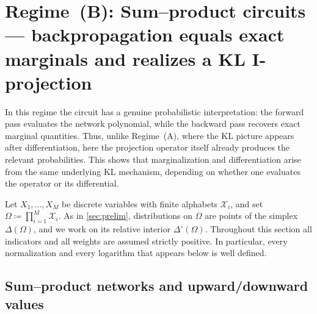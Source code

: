 \documentclass[12pt]{article}
\newcommand{\1}{\mathbb{1}}
\newcommand{\defeq}{\coloneq}
\theoremstyle{definition}
\begin{document}
\section{Regime~(B): Sum--product circuits --- backpropagation equals exact marginals and realizes a KL I-projection}
\label{sec:caseF}

In this regime the circuit has a genuine probabilistic interpretation: the forward pass evaluates the network polynomial, while the backward pass recovers exact marginal quantities. Thus, unlike Regime~(A), where the KL picture appears after differentiation, here the projection operator itself already produces the relevant probabilities. This shows that marginalization and differentiation arise from the same underlying KL mechanism, depending on whether one evaluates the operator or its differential.

Let $X_1,\ldots,X_M$ be discrete variables with finite alphabets $\mathcal{X}_i$, and set $\Omega \defeq \prod_{i=1}^M \mathcal{X}_i$. As in \cref{sec:prelim}, distributions on $\Omega$ are points of the simplex $\Delta(\Omega)$, and we work on its relative interior $\Delta^\circ(\Omega)$. Throughout this section all indicators and all weights are assumed strictly positive. In particular, every normalization and every logarithm that appears below is well defined.

\subsection{Sum--product networks and upward/downward values}
\end{document}
